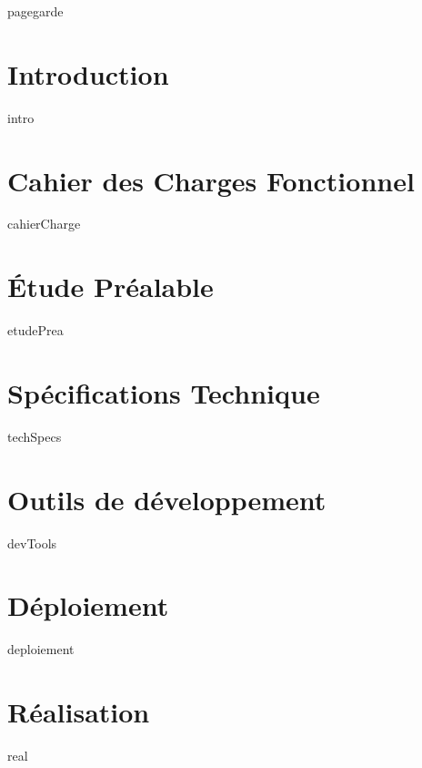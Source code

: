\documentclass[a4paper, 12pt, titlepage, oneside, french]{article}
\begin{document}
{pagegarde}
\newpage

\tableofcontents
\newpage

\section{Introduction}
{intro}
\newpage

\section{Cahier des Charges Fonctionnel}
{cahierCharge}
\newpage

\section{Étude Préalable}
{etudePrea}
\newpage

\section{Spécifications Technique}
{techSpecs}
\newpage

\section{Outils de développement}
{devTools}
\newpage

\section{Déploiement}
{deploiement}
\newpage

\section{Réalisation}
{real}
\newpage

\printglossary[title=Acronymes,type=\acronymtype]
\newpage 
\printglossary
\newpage 

\printbibliography
\end{document}
